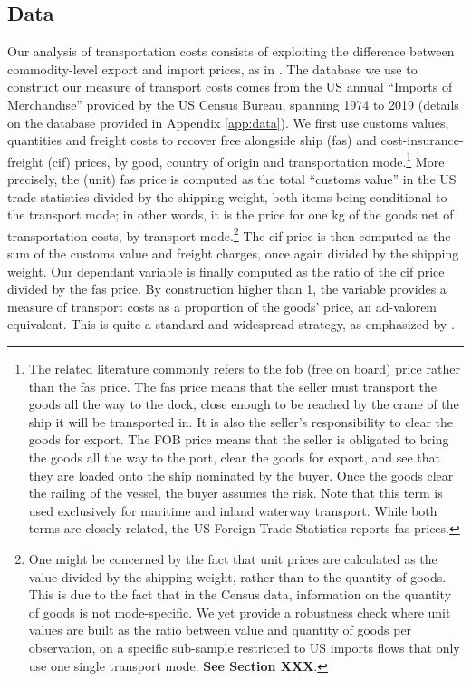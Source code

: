 \documentclass[a4paper,11pt]{article}
\begin{document}
\subsection{Data}

Our analysis of transportation costs consists of exploiting the difference between commodity-level export and import prices, as in \cite{hummels2007}. The database we use to construct our measure of transport costs comes from the US annual ``Imports of Merchandise'' provided by the US Census Bureau, spanning 1974 to 2019 (details on the database provided in Appendix \ref{app:data}). We first use customs values, quantities and freight costs to recover free alongside ship (fas) and cost-insurance-freight (cif) prices, by good, country of origin and transportation mode.\footnote{The related literature commonly refers to the fob (free on board) price rather than the fas price. The fas price means that the seller must transport the goods all the way to the dock, close enough to be reached by the crane of the ship it will be transported in. It is also the seller's responsibility to clear the goods for export. The FOB price means that the seller is obligated to bring the goods all the way to the port, clear the goods for export, and see that they are loaded onto the ship nominated by the buyer. Once the goods clear the railing of the vessel, the buyer assumes the risk. Note that this term is used exclusively for maritime and inland waterway transport. While both terms are closely related, the US Foreign Trade Statistics reports fas prices.} More precisely, the (unit) fas price is computed as the total ``customs value'' in the US trade statistics divided by the shipping weight, both items being conditional to the transport mode; in other words, it is the price for one kg of the goods net of transportation costs, by transport mode.\footnote{One might be concerned by the fact that unit prices are calculated as the value divided by the shipping weight, rather than to the quantity of goods. This is due to the fact that in the Census data, information on the quantity of goods is not mode-specific. We yet provide a robustness check where unit values are built as the ratio between value and quantity of goods per observation, on a specific sub-sample restricted to US imports flows that only use one single transport mode. \textbf{See Section XXX}.} The cif price is then computed as the sum of the customs value and freight charges, once again divided by the shipping weight. Our dependant variable is finally computed as the ratio of the cif price divided by the fas price. By construction higher than 1, the variable provides a measure of transport costs as a proportion of the goods' price, an ad-valorem equivalent. This is quite a standard and widespread strategy, as emphasized by \cite{anderson_wincoop_jel}.
\end{document}
